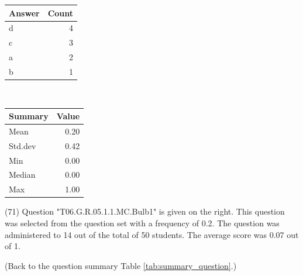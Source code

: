 \documentclass[12pt,english,nohyper]{tufte-handout}\usepackage[]{graphicx}\usepackage[]{color}
\begin{document}
\begin{center}%
\begin{tabular}{lr}
  \hline
Answer & Count \\ 
  \hline
d &   4 \\ 
  c &   3 \\ 
  a &   2 \\ 
  b &   1 \\ 
   \hline
\end{tabular}
~~~~~~~~%
\begin{tabular}{lr}
  \hline
Summary & Value \\ 
  \hline
Mean & 0.20 \\ 
  Std.dev & 0.42 \\ 
  Min & 0.00 \\ 
  Median & 0.00 \\ 
  Max & 1.00 \\ 
   \hline
\end{tabular}
\end{center}\newpage{} (71) Question "T06.G.R.05.1.1.MC.Bulb1" is given on the right. This question was selected from the question set with a frequency of 0.2. The question was administered to 14 out of the total of 50 students. The average score was 0.07 out of 1.

 (Back to the question summary Table \ref{tab:summary_question}.)
\end{document}
